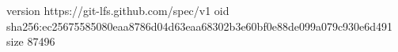 version https://git-lfs.github.com/spec/v1
oid sha256:ec25675585080eaa8786d04d63eaa68302b3e60bf0e88de099a079c930e6d491
size 87496
